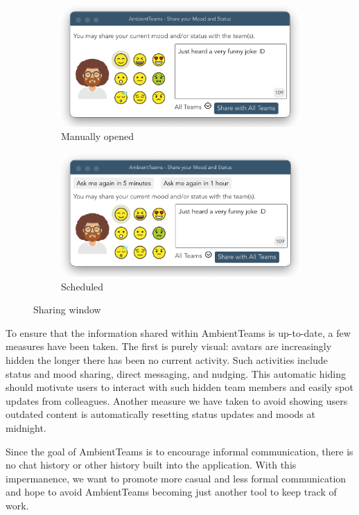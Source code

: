 \begin{figure}[h]
    \centering
    \begin{subfigure}{.5\textwidth}
        \centering
        \includegraphics[width=.8\linewidth]{./images/sharing_manual.png}
        \caption{Manually opened }
        \label{fig:sharing_manual}
    \end{subfigure}%
    \begin{subfigure}{.5\textwidth}
        \centering
        \includegraphics[width=.8\linewidth]{./images/sharing_auto.png}
        \caption{Scheduled }
        \label{fig:sharing_auto}
    \end{subfigure}
    \caption{Sharing window}
\end{figure}

To ensure that the information shared within AmbientTeams is up-to-date, a few measures have been taken. The first is purely visual: avatars are increasingly hidden the longer there has been no current activity. Such activities include status and mood sharing, direct messaging, and nudging. This automatic hiding should motivate users to interact with such hidden team members and easily spot updates from colleagues. Another measure we have taken to avoid showing users outdated content is automatically resetting status updates and moods at midnight.

Since the goal of AmbientTeams is to encourage informal communication, there is no chat history or other history built into the application. With this impermanence, we want to promote more casual and less formal communication and hope to avoid AmbientTeams becoming just another tool to keep track of work.

